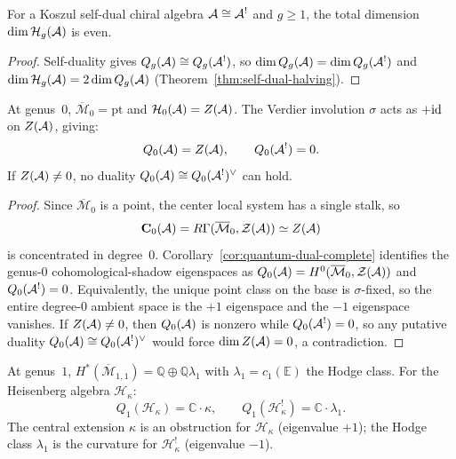 \begin{corollary}
\label{cor:thqg-III-dimension-parity}
For a Koszul self-dual chiral algebra $\mathcal{A} \cong \mathcal{A}^!$ and
$g \ge 1$, the total dimension
$\dim \mathcal{H}_g(\mathcal{A})$ is even.
\end{corollary}

\begin{proof}
Self-duality gives $Q_g(\mathcal{A}) \cong Q_g(\mathcal{A}^!)$, so
$\dim Q_g(\mathcal{A}) = \dim Q_g(\mathcal{A}^!)$ and
$\dim \mathcal{H}_g(\mathcal{A})
= 2 \dim Q_g(\mathcal{A})$
(Theorem~\ref{thm:self-dual-halving}).
\end{proof}

\begin{proposition}
\label{prop:thqg-III-genus-0}
At genus~$0$, $\overline{\mathcal{M}}_0 = \mathrm{pt}$ and
$\mathcal{H}_0(\mathcal{A}) = Z(\mathcal{A})$.
The Verdier involution $\sigma$ acts as $+\mathrm{id}$ on $Z(\mathcal{A})$,
giving:
\[
Q_0(\mathcal{A}) = Z(\mathcal{A}), \qquad Q_0(\mathcal{A}^!) = 0.
\]
If $Z(\mathcal{A})\neq 0$, no duality
$Q_0(\mathcal{A}) \cong Q_0(\mathcal{A}^!)^{\vee}$ can hold.
\end{proposition}

\begin{proof}
Since $\overline{\mathcal{M}}_0$ is a point, the center
local system has a single stalk, so
\[
\mathbf{C}_0(\mathcal{A})
= R\Gamma(\overline{\mathcal{M}}_0,\mathcal{Z}(\mathcal{A}))
\simeq Z(\mathcal{A})
\]
is concentrated in degree~$0$.
Corollary~\ref{cor:quantum-dual-complete} identifies the
genus-$0$ cohomological-shadow eigenspaces as
$Q_0(\mathcal{A})=H^0(\overline{\mathcal{M}}_0,\mathcal{Z}(\mathcal{A}))$
and $Q_0(\mathcal{A}^!)=0$.
Equivalently, the unique point class on the base is
$\sigma$-fixed, so the entire degree-$0$ ambient space is the
$+1$ eigenspace and the $-1$ eigenspace vanishes.
If $Z(\mathcal{A})\neq 0$, then $Q_0(\mathcal{A})$ is nonzero while
$Q_0(\mathcal{A}^!)=0$, so any putative duality
$Q_0(\mathcal{A}) \cong Q_0(\mathcal{A}^!)^{\vee}$ would force
$\dim Z(\mathcal{A})=0$, a contradiction.
\end{proof}

\begin{proposition}
\label{prop:thqg-III-genus-1}
At genus~$1$,
$H^*(\overline{\mathcal{M}}_{1,1})
= \mathbb{Q} \oplus \mathbb{Q}\lambda_1$
with $\lambda_1 = c_1(\mathbb{E})$ the Hodge class.
For the Heisenberg algebra $\mathcal{H}_\kappa$:
\begin{equation}\label{eq:thqg-III-heisenberg-genus-1}
Q_1(\mathcal{H}_\kappa) = \mathbb{C} \cdot \kappa,
\qquad
Q_1(\mathcal{H}_\kappa^!) = \mathbb{C} \cdot \lambda_1.
\end{equation}
The central extension $\kappa$ is an obstruction for
$\mathcal{H}_\kappa$ (eigenvalue $+1$); the Hodge class
$\lambda_1$ is the curvature for $\mathcal{H}_\kappa^!$
(eigenvalue $-1$).
\end{proposition}

